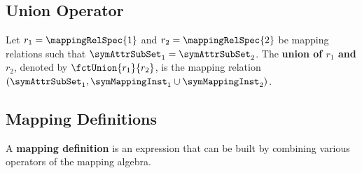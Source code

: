 \subsection{Union Operator}%
\label{sub:union_operator}
\begin{definition}
	\label{def:union_operator}
	Let $r_{1} = \mappingRelSpec{1}$ and
	$r_{2} = \mappingRelSpec{2}$ be mapping relations
    such that $\symAttrSubSet_1 = \symAttrSubSet_2$.
	The \textbf{union of $r_{1}$ and $r_{2}$}, denoted by
	$\fctUnion{r_{1}}{r_{2}}$, is the mapping relation $(\symAttrSubSet_1, \symMappingInst_1 \cup \symMappingInst_2)$.
\end{definition}



\subsection{Mapping Definitions}%
\label{sub:mapping_definition}

\begin{definition}
    \label{def:mapping_definition}
    A \textbf{mapping definition}  is an expression that can be built by 
    combining various operators of the mapping algebra. 
\end{definition}




